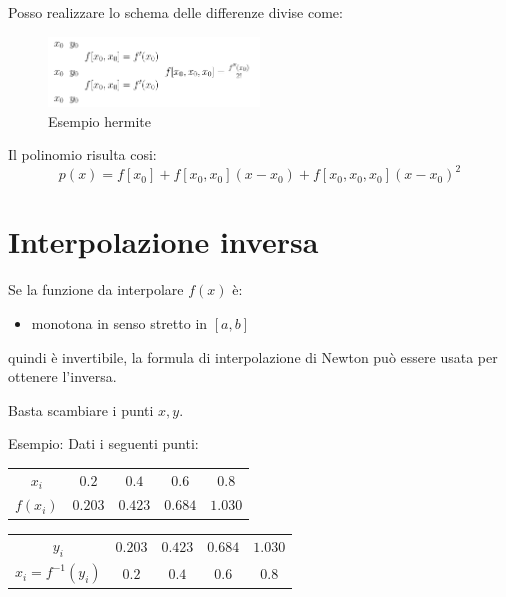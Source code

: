 Posso realizzare lo schema delle differenze divise come:
\begin{figure}[h!]
  \begin{center}
    \includegraphics[width=0.5\textwidth]{./images/esempio_hermite.png}
  \end{center}
  \caption{Esempio hermite}
  \label{fig:esempio_hermite}
\end{figure}


Il polinomio risulta cosi:
\begin{equation}
  p(x) = f[x_0] + f[x_0, x_0](x - x_0) + f[x_0, x_0, x_0](x-x_0)^2
\end{equation}


\section{Interpolazione inversa}
Se la funzione da interpolare $f(x)$ è:
\begin{itemize}
  \item monotona in senso stretto in $[a, b]$
\end{itemize}
quindi è invertibile, la formula di interpolazione di Newton può essere usata per ottenere 
l'inversa.

Basta scambiare i punti $x, y$.

Esempio:
Dati i seguenti punti:

\begin{center}
  \begin{tabular}{c | c c c c}
    $x_i$ & $0.2$ & $0.4$ & $0.6$ & $0.8$ \\
    $f(x_i)$ & $0.203$ & $0.423$ & $0.684$ & $1.030$
  \end{tabular}
\end{center}


\begin{center}
  \begin{tabular}{c | c c c c}
    $y_i$ & $0.203$ & $0.423$ & $0.684$ & $1.030$ \\
    $x_i = f^{-1}(y_i)$ & $0.2$ & $0.4$ & $0.6$ & $0.8$ 
  \end{tabular}
\end{center}


